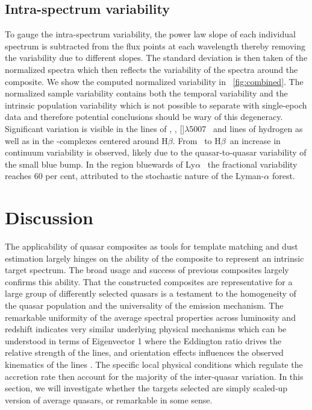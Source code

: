 \documentclass{aa}    %
\newcommand{\figref}[1]{\ref{fig:#1}}
\newcommand{\Fig}[1]{\figurename~\figref{#1}}
\newcommand{\fig}[1]{\Fig{#1}}
\newcommand{\sectlabel}[1]{\label{sect:#1}}
\newcommand{\lya}{Ly$\alpha$}
\newcommand{\hb}{H$\beta$}
\newcommand{\oiii}{[\ion{O}{iii}]$\lambda$5007}
\newcommand{\feii}{\ion{Fe}{ii}}
\newcommand{\civ}{\ion{C}{iv}}
\newcommand{\mgii}{\ion{Mg}{ii}}
\begin{document}
 \subsection{Intra-spectrum variability}  \sectlabel{variability}
 
To gauge the intra-spectrum variability, the power law slope of each individual
spectrum is subtracted from the flux points at each wavelength thereby removing
the variability due to different slopes. The standard deviation is then taken of
the normalized spectra which then reflects the variability of the spectra around
the composite. We show the computed
 normalized variability in \fig{combined}. The normalized sample variability
contains both the temporal variability and the intrinsic population variability
which is not possible to separate with single-epoch data
 and therefore potential conclusions should be wary of this
 degeneracy.  Significant variation is visible in the lines of \civ,
 \mgii, \oiii~ and lines of hydrogen as well as in the \feii-complexes
 centered around \hb. From \civ~to \hb~an increase in continuum
 variability is observed, likely due to the quasar-to-quasar
 variability of the small blue bump. In the region bluewards of \lya~
 the fractional variability reaches 60 per cent, attributed to the
 stochastic nature of the Lyman-$\alpha$ forest.

\section{Discussion}  \sectlabel{discuss}

The applicability of quasar composites as tools for template matching
and dust estimation largely hinges on the ability of the composite to
represent an intrinsic target spectrum. The broad usage and success of
previous composites largely confirms this ability. That the
constructed composites are representative for a large group of
differently selected quasars is a testament to the homogeneity of the
quasar population and the universality of the emission mechanism.  The
remarkable uniformity of the average spectral properties across
luminosity and redshift indicates very similar underlying physical
mechanisms which can be understood in terms of Eigenvector 1
\citep{Boroson1992, Francis1992} where the Eddington ratio drives the
relative strength of the lines, and orientation effects influences the
observed kinematics of the lines \citep{Shen2014a}. The specific local
physical conditions which regulate the accretion rate then account for
the majority of the inter-quasar variation. In this section, we will
investigate whether the targets selected are simply scaled-up version
of average quasars, or remarkable in some sense.
\end{document}
